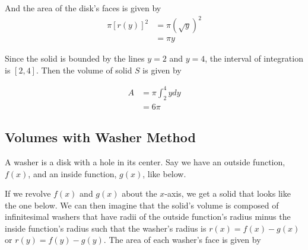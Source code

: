         \noindent And the area of the disk's faces is given by
        \begin{align*}
            \pi[r(y)]^2 &= \pi(\sqrt{y})^2 \\
            &= \pi y
        \end{align*}

        \noindent Since the solid is bounded by the lines $y=2$ and $y=4$, the interval of
        integration is $[2,4]$. Then the volume of solid $S$ is given by

        \begin{align*}
            A &= \pi\int^4_2 ydy \\
            &= 6\pi
        \end{align*}


    \pagebreak
    \subsection{Volumes with Washer Method}
        A washer is a disk with a hole in its center. Say we have an outside function, $f(x)$,
        and an inside function, $g(x)$, like below.

        \begin{center}
        \end{center}

        \noindent If we revolve $f(x)$ and $g(x)$ about the $x$-axis, we get a solid that looks
        like the one below. We can then imagine that the solid's volume is composed of
        infinitesimal washers that have radii of the outside function's radius minus the inside
        function's radius such that the washer's radius is $r(x)=f(x)-g(x)$ or $r(y)=f(y)-g(y)$.
        The area of each washer's face is given by

